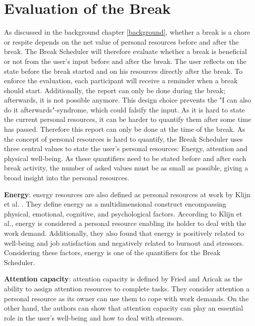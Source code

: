 \documentclass{hasel_thesis}
\begin{document}
\section{Evaluation of the Break} \label{evaluation_break}
As discussed in the background chapter \ref{background}, whether a break is a chore or respite depends on the net value of personal resources before and after the break. The Break Scheduler will therefore evaluate whether a break is beneficial or not from the user's input before and after the break. The user reflects on the state before the break started and on his resources directly after the break. To enforce the evaluation, each participant will receive a reminder when a break should start. Additionally, the report can only be done during the break; afterwards, it is not possible anymore. This design choice prevents the "I can also do it afterwards"-syndrome, which could falsify the input. As it is hard to state the current personal resources, it can be harder to quantify them after some time has passed. Therefore this report can only be done at the time of the break. As the concept of personal resources is hard to quantify, the Break Scheduler uses three central values to state the user's personal resources: Energy, attention and physical well-being. As these quantifiers need to be stated before and after each break activity, the number of asked values must be as small as possible, giving a broad insight into the personal resources. 

\textbf{Energy}: energy resources are also defined as personal resources at work by Klijn et al. \cite{klijn.2021}. They define energy as a multidimensional construct encompassing physical, emotional, cognitive, and psychological factors. According to Klijn et al., energy is considered a personal resource enabling its holder to deal with the work demand. Additionally, they also found that energy is positively related to well-being and job satisfaction and negatively related to burnout and stressors. Considering these factors, energy is one of the quantifiers for the Break Scheduler.

\textbf{Attention capacity}: attention capacity is defined by Fried and Aricak \cite{Fried2014} as the ability to assign attention resources to complete tasks. They consider attention a personal resource as its owner can use them to cope with work demands. On the other hand, the authors can show that attention capacity can play an essential role in the user's well-being and how to deal with stressors.
\end{document}
